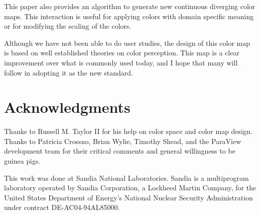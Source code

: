 \documentclass{acmsiggraph}               %
\begin{document}
This paper also provides an algorithm to generate new continuous diverging
color maps.  This interaction is useful for applying colors with domain
specific meaning or for modifying the scaling of the colors.

Although we have not been able to do user studies, the design of this color
map is based on well established theories on color perception.  This map is
a clear improvement over what is commonly used today, and I hope that many
will follow in adopting it as the new standard.


\section*{Acknowledgments}

Thanks to Russell M. Taylor II for his help on color space and color map
design.  Thanks to Patricia Crossno, Brian Wylie, Timothy Shead, and the
ParaView development team for their critical comments and general
willingness to be guinea pigs.

This work was done at Sandia National Laboratories.  Sandia is a
multiprogram laboratory operated by Sandia Corporation, a Lockheed Martin
Company, for the United States Department of Energy's National Nuclear
Security Administration under contract DE-AC04-94AL85000.




\end{document}
